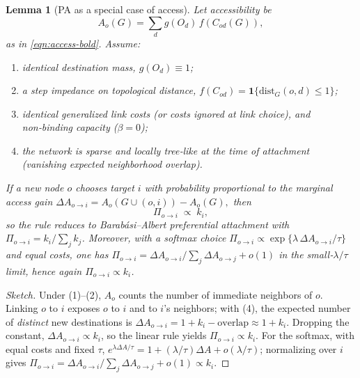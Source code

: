 \documentclass{article}[12pt]
\newtheorem{lemma}{Lemma}
\begin{document}
\begin{lemma}[PA as a special case of access]
Let accessibility be
\[
A_o(G)=\sum_{d} g(O_d)\,f(C_{od}(G)),
\]
as in \autoref{eqn:access-bold}. Assume:
\begin{enumerate}
\item identical destination mass, $g(O_d)\equiv 1$;
\item a step impedance on topological distance, $f(C_{od})=\mathbf{1}\{\text{dist}_G(o,d)\le 1\}$;
\item identical generalized link costs (or costs ignored at link choice), and non‑binding capacity ($\beta=0$);
\item the network is sparse and locally tree‑like at the time of attachment (vanishing expected neighborhood overlap).
\end{enumerate}
If a new node $o$ chooses target $i$ with probability proportional to the marginal access gain
\(
\Delta A_{o\to i}=A_o(G\cup (o,i)) - A_o(G),
\)
then
\[
\Pi_{o\to i} \;\propto\; k_i,
\]
so the rule reduces to Barabási–Albert preferential attachment with $\Pi_{o\to i}=k_i/\sum_j k_j$. 
Moreover, with a softmax choice $\Pi_{o\to i}\propto \exp\!\big\{\lambda\,\Delta A_{o\to i}/\tau\big\}$ and equal costs, one has
\(
\Pi_{o\to i}=\Delta A_{o\to i}/\sum_j \Delta A_{o\to j}+o(1)
\)
in the small‑$\lambda/\tau$ limit, hence again $\Pi_{o\to i}\propto k_i$.
\end{lemma}

\begin{proof}[Sketch]
Under (1)–(2), $A_o$ counts the number of immediate neighbors of $o$. 
Linking $o$ to $i$ exposes $o$ to $i$ and to $i$’s neighbors; with (4), the expected number of \emph{distinct} new destinations is
\(
\Delta A_{o\to i} = 1 + k_i - \text{overlap} \approx 1 + k_i.
\)
Dropping the constant, $\Delta A_{o\to i}\propto k_i$, so the linear rule yields $\Pi_{o\to i}\propto k_i$. 
For the softmax, with equal costs and fixed $\tau$, $e^{\lambda \Delta A/\tau}=1+(\lambda/\tau)\Delta A+o(\lambda/\tau)$; normalizing over $i$ gives $\Pi_{o\to i}=\Delta A_{o\to i}/\sum_j \Delta A_{o\to j}+o(1)\propto k_i$.
\end{proof}

\end{document}
